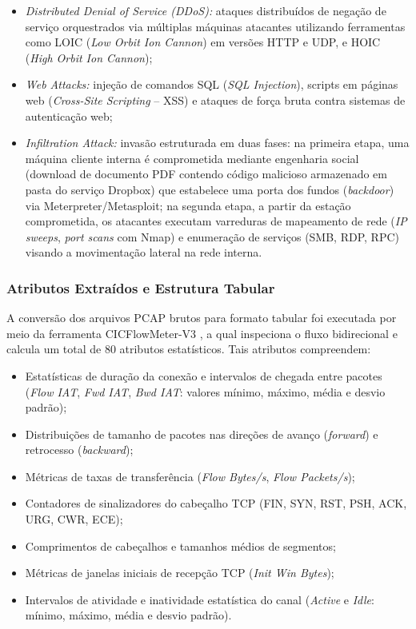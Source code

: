 \begin{enumerate}
\begin{itemize}
        \item \emph{Distributed Denial of Service (DDoS):} ataques distribuídos de negação de serviço orquestrados via múltiplas máquinas atacantes utilizando ferramentas como LOIC (\emph{Low Orbit Ion Cannon}) em versões HTTP e UDP, e HOIC (\emph{High Orbit Ion Cannon});
        \item \emph{Web Attacks:} injeção de comandos SQL (\emph{SQL Injection}), scripts em páginas web (\emph{Cross-Site Scripting} -- XSS) e ataques de força bruta contra sistemas de autenticação web;
        \item \emph{Infiltration Attack:} invasão estruturada em duas fases: na primeira etapa, uma máquina cliente interna é comprometida mediante engenharia social (download de documento PDF contendo código malicioso armazenado em pasta do serviço Dropbox) que estabelece uma porta dos fundos (\emph{backdoor}) via Meterpreter/Metasploit; na segunda etapa, a partir da estação comprometida, os atacantes executam varreduras de mapeamento de rede (\emph{IP sweeps}, \emph{port scans} com Nmap) e enumeração de serviços (SMB, RDP, RPC) visando a movimentação lateral na rede interna.
    \end{itemize}
\end{enumerate}

\subsubsection{Atributos Extraídos e Estrutura Tabular}

A conversão dos arquivos PCAP brutos para formato tabular foi executada por meio da ferramenta CICFlowMeter-V3 \cite{Sharafaldin2018TowardGA}, a qual inspeciona o fluxo bidirecional e calcula um total de 80 atributos estatísticos. Tais atributos compreendem:
\begin{itemize}
    \item Estatísticas de duração da conexão e intervalos de chegada entre pacotes (\emph{Flow IAT}, \emph{Fwd IAT}, \emph{Bwd IAT}: valores mínimo, máximo, média e desvio padrão);
    \item Distribuições de tamanho de pacotes nas direções de avanço (\emph{forward}) e retrocesso (\emph{backward});
    \item Métricas de taxas de transferência (\emph{Flow Bytes/s}, \emph{Flow Packets/s});
    \item Contadores de sinalizadores do cabeçalho TCP (FIN, SYN, RST, PSH, ACK, URG, CWR, ECE);
    \item Comprimentos de cabeçalhos e tamanhos médios de segmentos;
    \item Métricas de janelas iniciais de recepção TCP (\emph{Init Win Bytes});
    \item Intervalos de atividade e inatividade estatística do canal (\emph{Active} e \emph{Idle}: mínimo, máximo, média e desvio padrão).
\end{itemize}

